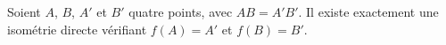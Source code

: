 Soient $A$, $B$, $A'$ et $B'$  quatre points, avec $AB=A'B'$. Il existe exactement une isométrie directe vérifiant $f(A)=A'$ et $f(B)=B'$.

\begin{reponses}
\end{reponses}

